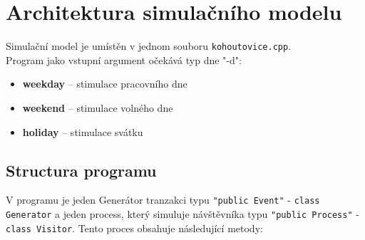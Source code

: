 \documentclass[a4paper, 11pt]{article}
\begin{document}
    \section{Architektura simulačního modelu}
    Simulační model je umístěn v jednom 
    souboru \verb|kohoutovice.cpp|. \\ Program jako vstupní argument očekává typ dne "-d":
    \begin{itemize}
    \item \textbf{weekday} -- stimulace pracovního dne
    \item \textbf{weekend} -- stimulace volného dne
    \item \textbf{holiday} -- stimulace svátku 
    \end{itemize}
    
    \subsection{Structura programu}
    V programu je jeden Generátor tranzakci typu \verb|"public Event"| - \verb|class Generator|
    a jeden process, který simuluje návštěvníka typu \verb|"public Process"| - \verb|class Visitor|.
    Tento proces obsahuje následující metody:
    
\end{document}
